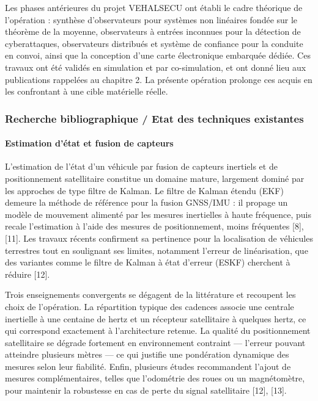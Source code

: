 Les phases antérieures du projet VEHALSECU ont établi le cadre théorique de l’opération : synthèse d’observateurs pour systèmes non linéaires fondée sur le théorème de la moyenne, observateurs à entrées inconnues pour la détection de cyberattaques, observateurs distribués et système de confiance pour la conduite en convoi, ainsi que la conception d’une carte électronique embarquée dédiée. Ces travaux ont été validés en simulation et par co-simulation, et ont donné lieu aux publications rappelées au chapitre 2. La présente opération prolonge ces acquis en les confrontant à une cible matérielle réelle.

\subsubsection{Recherche bibliographique / Etat des techniques existantes}

\paragraph{Estimation d’état et fusion de capteurs}

L’estimation de l’état d’un véhicule par fusion de capteurs inertiels et de positionnement satellitaire constitue un domaine mature, largement dominé par les approches de type filtre de Kalman. Le filtre de Kalman étendu (EKF) demeure la méthode de référence pour la fusion GNSS/IMU : il propage un modèle de mouvement alimenté par les mesures inertielles à haute fréquence, puis recale l’estimation à l’aide des mesures de positionnement, moins fréquentes [8], [11]. Les travaux récents confirment sa pertinence pour la localisation de véhicules terrestres tout en soulignant ses limites, notamment l’erreur de linéarisation, que des variantes comme le filtre de Kalman à état d’erreur (ESKF) cherchent à réduire [12].

Trois enseignements convergents se dégagent de la littérature et recoupent les choix de l’opération. La répartition typique des cadences associe une centrale inertielle à une centaine de hertz et un récepteur satellitaire à quelques hertz, ce qui correspond exactement à l’architecture retenue. La qualité du positionnement satellitaire se dégrade fortement en environnement contraint — l’erreur pouvant atteindre plusieurs mètres — ce qui justifie une pondération dynamique des mesures selon leur fiabilité. Enfin, plusieurs études recommandent l’ajout de mesures complémentaires, telles que l’odométrie des roues ou un magnétomètre, pour maintenir la robustesse en cas de perte du signal satellitaire [12], [13].


